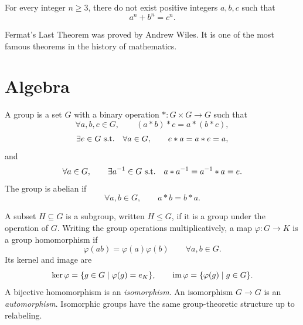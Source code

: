     \begin{theorem}
        For every integer $n\geq 3$, there do not exist positive integers
        $a,b,c$ such that
        \[
            a^n+b^n=c^n.
        \]
    \end{theorem}

    \begin{remark}
        Fermat's Last Theorem was proved by Andrew Wiles. It is one of the most
        famous theorems in the history of mathematics.
    \end{remark}

    \chapter{Algebra}



    \begin{definition}[Group]
        A group is a set $G$ with a binary operation $\ast\colon G\times G\to G$ such that
        \[
            \forall a,b,c\in G,
            \qquad
            (a\ast b)\ast c=a\ast(b\ast c),
        \]
        \[
            \exists e\in G\ \textnormal{s.t.}\quad
            \forall a\in G,
            \qquad
            e\ast a=a\ast e=a,
        \]
        and
        \[
            \forall a\in G,
            \qquad
            \exists a^{-1}\in G\ \textnormal{s.t.}\quad
            a\ast a^{-1}=a^{-1}\ast a=e.
        \]
        The group is abelian if
        \[
            \forall a,b\in G,
            \qquad
            a\ast b=b\ast a.
        \]
    \end{definition}


    \begin{definition}
        A subset $H\subseteq G$ is a subgroup, written $H\leq G$, if it is a
        group under the operation of $G$. Writing the group operations
        multiplicatively, a map $\varphi\colon G\to K$ is a group
        homomorphism if
        \[
            \varphi(ab)=\varphi(a)\varphi(b)
            \qquad
            \forall a,b\in G.
        \]
        Its kernel and image are
        \[
            \ker\varphi=\{g\in G\mid\varphi(g)=e_K\},
            \qquad
            \operatorname{im}\varphi=\{\varphi(g)\mid g\in G\}.
        \]
        A bijective homomorphism is an \emph{isomorphism}. An isomorphism
        $G\to G$ is an \emph{automorphism}. Isomorphic groups have the same
        group-theoretic structure up to relabeling.
    \end{definition}

